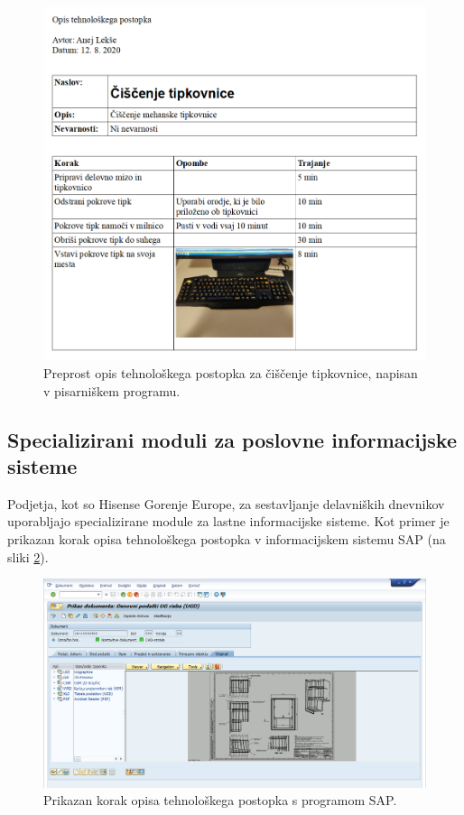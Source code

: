 \documentclass[a4paper, 12pt]{book}
\begin{document}
\begin{figure}[H]
\begin{center}
\includegraphics[width=13.5cm]{report_writer}
\end{center}
\caption{Preprost opis tehnološkega postopka za čiščenje tipkovnice, napisan v pisarniškem programu.}
\label{report_writer}
\end{figure}



\subsection{Specializirani moduli za poslovne informacijske sisteme}

Podjetja, kot so Hisense Gorenje Europe, za sestavljanje delavniških dnevnikov uporabljajo specializirane module za lastne informacijske sisteme.
Kot primer je prikazan korak opisa tehnološkega postopka v informacijskem sistemu SAP (na sliki \ref{sap_1}).

\begin{figure}[H]
\begin{center}
\includegraphics[width=13cm]{sap_1}
\end{center}
\caption{Prikazan korak opisa tehnološkega postopka s programom SAP.}
\label{sap_1}
\end{figure}
\end{document}
